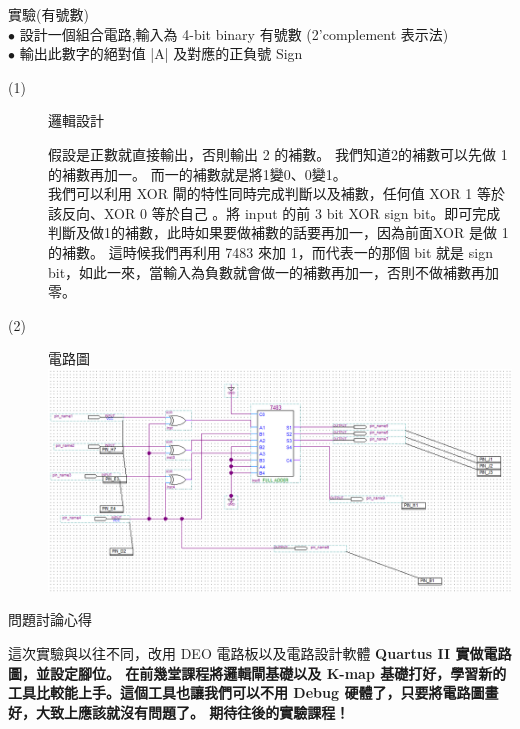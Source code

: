 \documentclass[12pt, a4paper]{article}
\begin{document}
\begin{description}
\begin{description}
        \fontsize{20}{22}\selectfont
        \item 實驗(有號數) \\[.3cm]
            \fontsize{16}{18}\selectfont
            $\bullet$ 設計一個組合電路,輸入為 4-bit binary 有號數 (2’complement 表示法)\\
            $\bullet$ 輸出此數字的絕對值 |A| 及對應的正負號 Sign 
            \begin{description}
              \item[(1)] 邏輯設計\\
                \begin{samepage}
                    假設是正數就直接輸出，否則輸出 2 的補數。
                    我們知道2的補數可以先做 1 的補數再加一。
                    而一的補數就是將1變0、0變1。\\
                    
                    我們可以利用 XOR 閘的特性同時完成判斷以及補數，任何值 XOR 1 等於該反向、XOR 0 等於自己
                    。將 input 的前 3 bit XOR sign bit。即可完成判斷及做1的補數，此時如果要做補數的話要再加一，因為前面XOR 是做 1 的補數。
                    這時候我們再利用 7483 來加 1，而代表一的那個 bit 就是 sign bit，如此一來，當輸入為負數就會做一的補數再加一，否則不做補數再加零。 
                \end{samepage}
              \item[(2)] 電路圖\\[.3cm]
                \includegraphics[width=13cm]{./image/ex2.png} 
            \end{description}
        \normalsize    
      \end{description}


    \item [三、]問題討論心得 \\[.6cm]
      \begin{minipage}[t]{\linewidth}
        \fontsize{16}{18}\selectfont
          這次實驗與以往不同，改用 DEO 電路板以及電路設計軟體 \bf{Quartus II} \normalfont 實做電路圖，並設定腳位。
          在前幾堂課程將邏輯閘基礎以及 K-map 基礎打好，學習新的工具比較能上手。這個工具也讓我們可以不用 Debug 硬體了，只要將電路圖畫好，大致上應該就沒有問題了。
          期待往後的實驗課程！
        \normalsize  
      \end{minipage}
  \normalsize
\end{description}
\end{document}
